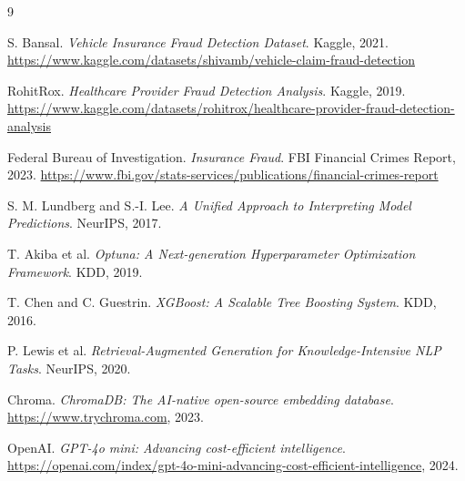 \documentclass[10pt,twocolumn]{article}
\begin{document}
\begin{thebibliography}{9}

S. Bansal.
\textit{Vehicle Insurance Fraud Detection Dataset}.
Kaggle, 2021.
\url{https://www.kaggle.com/datasets/shivamb/vehicle-claim-fraud-detection}

RohitRox.
\textit{Healthcare Provider Fraud Detection Analysis}.
Kaggle, 2019.
\url{https://www.kaggle.com/datasets/rohitrox/healthcare-provider-fraud-detection-analysis}

Federal Bureau of Investigation.
\textit{Insurance Fraud}.
FBI Financial Crimes Report, 2023.
\url{https://www.fbi.gov/stats-services/publications/financial-crimes-report}

S. M. Lundberg and S.-I. Lee.
\textit{A Unified Approach to Interpreting Model Predictions}.
NeurIPS, 2017.

T. Akiba et al.
\textit{Optuna: A Next-generation Hyperparameter Optimization Framework}.
KDD, 2019.

T. Chen and C. Guestrin.
\textit{XGBoost: A Scalable Tree Boosting System}.
KDD, 2016.

P. Lewis et al.
\textit{Retrieval-Augmented Generation for Knowledge-Intensive NLP Tasks}.
NeurIPS, 2020.

Chroma.
\textit{ChromaDB: The AI-native open-source embedding database}.
\url{https://www.trychroma.com}, 2023.

OpenAI.
\textit{GPT-4o mini: Advancing cost-efficient intelligence}.
\url{https://openai.com/index/gpt-4o-mini-advancing-cost-efficient-intelligence}, 2024.

\end{thebibliography}
\end{document}
